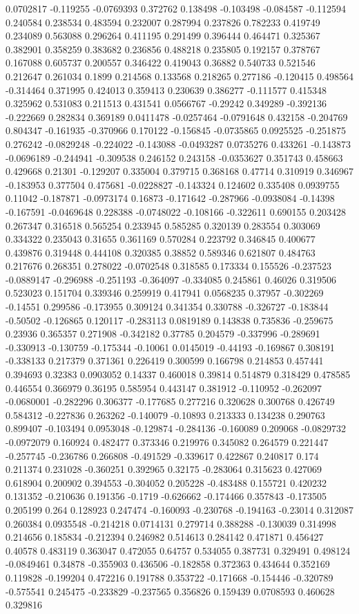 0.0702817 -0.119255 -0.0769393 0.372762 0.138498 -0.103498 -0.084587 -0.112594 0.240584 0.238534 0.483594 0.232007 0.287994 0.237826 0.782233 0.419749 0.234089 0.563088 0.296264 0.411195 0.291499 0.396444 0.464471 0.325367 0.382901 0.358259 0.383682 0.236856 0.488218 0.235805 0.192157 0.378767 0.167088 0.605737 0.200557 0.346422 0.419043 0.36882 0.540733 0.521546 0.212647 0.261034 0.1899 0.214568 0.133568 0.218265 0.277186 -0.120415 0.498564 -0.314464 0.371995 0.424013 0.359413 0.230639 0.386277 -0.111577 0.415348 0.325962 0.531083 0.211513 0.431541 0.0566767 -0.29242 0.349289 -0.392136 -0.222669 0.282834 0.369189 0.0411478 -0.0257464 -0.0791648 0.432158 -0.204769 0.804347 -0.161935 -0.370966 0.170122 -0.156845 -0.0735865 0.0925525 -0.251875 0.276242 -0.0829248 -0.224022 -0.143088 -0.0493287 0.0735276 0.433261 -0.143873 -0.0696189 -0.244941 -0.309538 0.246152 0.243158 -0.0353627 0.351743 0.458663 0.429668 0.21301 -0.129207 0.335004 0.379715 0.368168 0.47714 0.310919 0.346967 -0.183953 0.377504 0.475681 -0.0228827 -0.143324 0.124602 0.335408 0.0939755 0.11042 -0.187871 -0.0973174 0.16873 -0.171642 -0.287966 -0.0938084 -0.14398 -0.167591 -0.0469648 0.228388 -0.0748022 -0.108166 -0.322611 0.690155 0.203428 0.267347 0.316518 0.565254 0.233945 0.585285 0.320139 0.283554 0.303069 0.334322 0.235043 0.31655 0.361169 0.570284 0.223792 0.346845 0.400677 0.439876 0.319448 0.444108 0.320385 0.38852 0.589346 0.621807 0.484763 0.217676 0.268351 0.278022 -0.0702548 0.318585 0.173334 0.155526 -0.237523 -0.0889147 -0.296988 -0.251193 -0.364097 -0.334085 0.245861 0.46026 0.319506 0.523023 0.151704 0.339346 0.259919 0.417941 0.0568235 0.37957 -0.302269 -0.14551 0.299586 -0.173955 0.309124 0.341354 0.330788 -0.326727 -0.183844 -0.50502 -0.126865 0.120117 -0.283113 0.0819189 0.143838 0.735836 -0.259675 0.23936 0.365357 0.271908 -0.342182 0.37785 0.204579 -0.337996 -0.289691 -0.330913 -0.130759 -0.175344 -0.10061 0.0145019 -0.44193 -0.169867 0.308191 -0.338133 0.217379 0.371361 0.226419 0.300599 0.166798 0.214853 0.457441 0.394693 0.32383 0.0903052 0.14337 0.460018 0.39814 0.514879 0.318429 0.478585 0.446554 0.366979 0.36195 0.585954 0.443147 0.381912 -0.110952 -0.262097 -0.0680001 -0.282296 0.306377 -0.177685 0.277216 0.320628 0.300768 0.426749 0.584312 -0.227836 0.263262 -0.140079 -0.10893 0.213333 0.134238 0.290763 0.899407 -0.103494 0.0953048 -0.129874 -0.284136 -0.160089 0.209068 -0.0829732 -0.0972079 0.160924 0.482477 0.373346 0.219976 0.345082 0.264579 0.221447 -0.257745 -0.236786 0.266808 -0.491529 -0.339617 0.422867 0.240817 0.174 0.211374 0.231028 -0.360251 0.392965 0.32175 -0.283064 0.315623 0.427069 0.618904 0.200902 0.394553 -0.304052 0.205228 -0.483488 0.155721 0.420232 0.131352 -0.210636 0.191356 -0.1719 -0.626662 -0.174466 0.357843 -0.173505 0.205199 0.264 0.128923 0.247474 -0.160093 -0.230768 -0.194163 -0.23014 0.312087 0.260384 0.0935548 -0.214218 0.0714131 0.279714 0.388288 -0.130039 0.314998 0.214656 0.185834 -0.212394 0.246982 0.514613 0.284142 0.471871 0.456427 0.40578 0.483119 0.363047 0.472055 0.64757 0.534055 0.387731 0.329491 0.498124 -0.0849461 0.34878 -0.355903 0.436506 -0.182858 0.372363 0.434644 0.352169 0.119828 -0.199204 0.472216 0.191788 0.353722 -0.171668 -0.154446 -0.320789 -0.575541 0.245475 -0.233829 -0.237565 0.356826 0.159439 0.0708593 0.460628 0.329816 